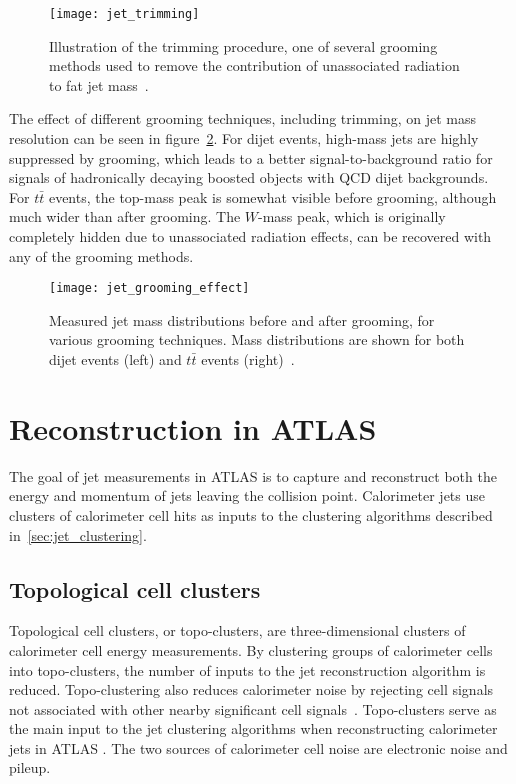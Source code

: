 \begin{figure}[!ht]
    \centering
\texttt{[image: jet\_trimming]}
\caption{Illustration of the trimming procedure, one of several grooming methods used to remove the contribution
of unassociated radiation to fat jet mass~\cite{jet-grooming-slides}.}
\label{fig:jet_trimming}
\end{figure}

The effect of different grooming techniques, including trimming, on jet mass resolution can be seen in figure~\ref{fig:jet_grooming_effect}.
For dijet events, high-mass jets are highly suppressed by grooming, which leads to a better signal-to-background ratio for signals of hadronically decaying boosted objects with QCD dijet backgrounds.
For $t\bar{t}$ events, the top-mass peak is somewhat visible before grooming, although much wider than after grooming.
The $W$-mass peak, which is originally completely hidden due to unassociated radiation effects, can be recovered with any of the grooming methods.

\begin{figure}[!ht]
    \centering
\texttt{[image: jet\_grooming\_effect]}
\caption{Measured jet mass distributions before and after grooming, for various grooming techniques.
Mass distributions are shown for both dijet events (left) and $t\bar{t}$ events (right)~\cite{jet-tasi-substructure}.}
\label{fig:jet_grooming_effect}
\end{figure}

\section{Reconstruction in ATLAS}\label{sec:jet_reconstruction}
The goal of jet measurements in ATLAS is to capture and reconstruct both the energy and momentum of jets leaving the collision point.
Calorimeter jets use clusters of calorimeter cell hits as inputs to the clustering algorithms described in~\ref{sec:jet_clustering}.

\subsection{Topological cell clusters}\label{subsec:jet_topo_clusters}
Topological cell clusters, or topo-clusters, are three-dimensional clusters of calorimeter cell energy measurements.
By clustering groups of calorimeter cells into topo-clusters, the number of inputs to the jet reconstruction algorithm is reduced.
Topo-clustering also reduces calorimeter noise by rejecting cell signals not associated with other nearby significant cell signals~\cite{jet-topo-cluster}.
Topo-clusters serve as the main input to the jet clustering algorithms when reconstructing calorimeter jets in ATLAS .
The two sources of calorimeter cell noise are electronic noise and pileup.

